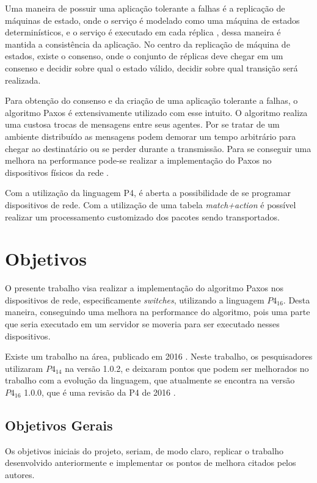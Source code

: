 \documentclass[12pt,
openright, 
oneside,
a4paper,
brazil]{facom-ufu-abntex2}
\begin{document}
Uma maneira de possuir uma aplicação tolerante a falhas é a replicação de máquinas
de estado, onde o serviço é modelado como uma máquina de estados determinísticos, e o
serviço é executado em cada réplica \citep{santos2012state}, dessa maneira é mantida
a consistência da aplicação. No centro da replicação de máquina de estados, existe o 
consenso, onde o conjunto de réplicas deve chegar em um consenso e decidir sobre 
qual o estado válido, decidir sobre qual transição será realizada. 

Para obtenção do consenso e da criação de uma aplicação tolerante a falhas, o algoritmo
Paxos é extensivamente utilizado com esse intuito. O algoritmo realiza uma custosa 
trocas de mensagens entre seus agentes. Por se tratar de um ambiente distribuído 
as mensagens podem demorar um tempo arbitrário para chegar ao destinatário ou se 
perder durante a transmissão. Para se conseguir uma melhora na performance pode-se 
realizar a implementação do Paxos no dispositivos físicos da rede
\citep{dang2016paxos}.

Com a utilização da linguagem P4, é aberta a possibilidade de se programar dispositivos
de rede. Com a utilização de uma tabela \textit{match+action} é possível 
realizar um processamento customizado dos pacotes sendo transportados.

\section{Objetivos}
O presente trabalho visa realizar a implementação do algoritmo Paxos nos dispositivos
de rede, especificamente \textit{switches}, utilizando a linguagem $P4_{16}$. 
Desta maneira, conseguindo uma melhora na performance do algoritmo, pois uma parte 
que seria executado em um servidor se moveria para ser executado nesses dispositivos.

Existe um trabalho na área, publicado em 2016 \citep{dang2016paxos}. Neste trabalho,
os pesquisadores utilizaram $P4_{14}$ na versão 1.0.2, e deixaram pontos que podem ser
melhorados no trabalho com a evolução da linguagem, que atualmente se encontra na versão
$P4_{16}$ 1.0.0, que é uma revisão da P4 de 2016 \citep{paxos16spec}.

\subsection{Objetivos Gerais}
Os objetivos iniciais do projeto, seriam, de modo claro, replicar o trabalho 
desenvolvido anteriormente e implementar os pontos de melhora citados pelos autores.
\end{document}
